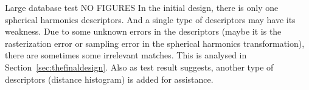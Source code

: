 \begin{enumerate}
Large database test
NO FIGURES
In the initial design, there is only one spherical harmonics descriptors. And a single type of descriptors may have its weakness. Due to some unknown errors in the descriptors (maybe it is the rasterization error or sampling error in the spherical harmonics transformation), there are sometimes some irrelevant matches. This is analysed in Section~\ref{sec:thefinaldesign}.  Also as test result suggests, another type of descriptors (distance histogram) is added for assistance. 

\end{enumerate}

